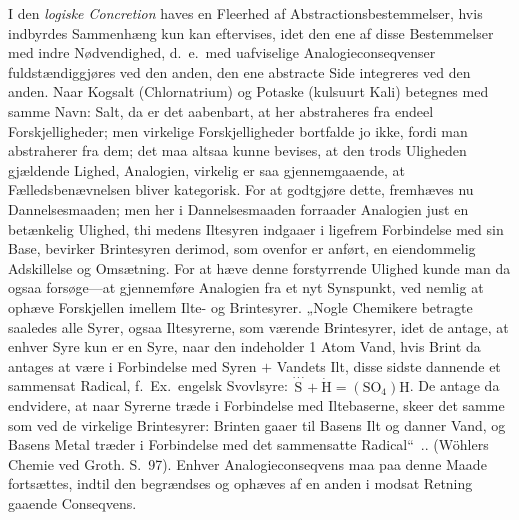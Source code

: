 \documentclass[12pt,a4paper]{book}
\begin{document}
I den \emph{logiske Concretion} haves en Fleerhed af
Abstractionsbestemmelser, hvis indbyrdes Sammenhæng kun
kan eftervises, idet den ene af disse Bestemmelser med
indre Nødvendighed, d.\ e.\ med uafviselige Analogieconseqvenser
fuldstændiggjøres ved den anden, den ene abstracte
Side integreres ved den anden. Naar Kogsalt
(Chlornatrium) og Potaske (kulsuurt Kali) betegnes med samme
Navn: Salt, da er det aabenbart, at her abstraheres fra
endeel Forskjelligheder; men virkelige Forskjelligheder bortfalde
jo ikke, fordi man abstraherer fra dem; det maa altsaa kunne
bevises, at den trods Uligheden gjældende Lighed, Analogien,
virkelig er saa gjennemgaaende, at Fælledsbenævnelsen bliver
kategorisk. For at godtgjøre dette, fremhæves nu Dannelsesmaaden;
men her i Dannelsesmaaden forraader Analogien
just en betænkelig Ulighed, thi medens Iltesyren indgaaer i
ligefrem Forbindelse med sin Base, bevirker Brintesyren derimod,
som ovenfor er anført, en eiendommelig Adskillelse og
Omsætning. For at hæve denne forstyrrende Ulighed kunde
man da ogsaa
forsøge---at gjennemføre Analogien fra et nyt
Synspunkt, ved nemlig at ophæve Forskjellen imellem Ilte-
og Brintesyrer. „Nogle Chemikere betragte saaledes alle
Syrer, ogsaa Iltesyrerne, som værende Brintesyrer, idet de
antage, at enhver Syre kun er en Syre, naar den indeholder
1 Atom Vand, hvis Brint da antages at være i Forbindelse
med Syren $+$ Vandets Ilt, disse sidste dannende et sammensat
Radical, f.\ Ex.\ engelsk Svovlsyre:
$\stackrel{\cdot\cdot\cdot}{\mathrm{S}} + \dot{\mathrm{H}} =
(\mathrm{SO}_4)\mathrm{H}$.
De antage da endvidere, at naar Syrerne træde i Forbindelse
med Iltebaserne, skeer det samme som ved de virkelige
Brintesyrer: Brinten gaaer til Basens Ilt og danner
Vand, og Basens Metal træder i Forbindelse med det
sammensatte Radical“\ .. (Wöhlers Chemie ved Groth. S.\ 97).
Enhver Analogieconseqvens maa paa denne Maade fortsættes,
indtil den begrændses og ophæves af en anden i modsat Retning
gaaende Conseqvens.
\end{document}
